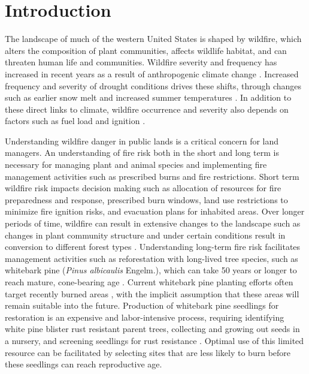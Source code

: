 \documentclass[11p]{article}
\begin{document}
\section{Introduction}

The landscape of much of the western United States is shaped by wildfire, which alters the composition of plant communities, affects wildlife habitat, and can threaten human life and communities.  Wildfire severity and frequency has increased in recent years as a result of anthropogenic climate change \citep{abatzoglouImpactAnthropogenicClimate2016,runningGlobalWarmingCausing2006,boerChangingWeatherExtremes2017,littellReviewRelationshipsDrought2016}.  Increased frequency and severity of drought conditions drives these shifts, through changes such as earlier snow melt \citep{tercekForecasts21stCentury2016} and increased summer temperatures \citep{runningGlobalWarmingCausing2006}.  In addition to these direct links to climate, wildfire occurrence and severity also depends on factors such as fuel load and ignition \citep{mckenzieClimateChangeEcohydrology2017}.

Understanding wildfire danger in public lands is a critical concern for land managers.  An understanding of fire risk both in the short and long term is necessary for managing plant and animal species and implementing fire management activities such as prescribed burns and fire restrictions. Short term wildfire risk impacts decision making such as allocation of resources for fire preparedness and response, prescribed burn windows, land use restrictions to minimize fire ignition risks, and evacuation plans for inhabited areas.  Over longer periods of time, wildfire can result in extensive changes to the landscape such as changes in plant community structure and under certain conditions result in conversion to different forest types \citep{coopWildfireDrivenForestConversion2020}. Understanding long-term fire risk facilitates management activities such as reforestation with long-lived tree species, such as whitebark pine (\textit{Pinus albicaulis} Engelm.), which can take 50 years or longer to reach mature, cone-bearing age \citep{tombackWhitebarkPineCommunities2001}. Current whitebark pine planting efforts often target recently burned areas \citep{keaneRangewideRestorationStrategy2012}, with the implicit assumption that these areas will remain suitable into the future. Production of whitebark pine seedlings for restoration is an expensive and labor-intensive process, requiring identifying white pine blister rust resistant parent trees, collecting and growing out seeds in a nursery, and screening seedlings for rust resistance \citep{tombackTammReviewCurrent2022}.  Optimal use of this limited resource can be facilitated by selecting sites that are less likely to burn before these seedlings can reach reproductive age.
\end{document}
